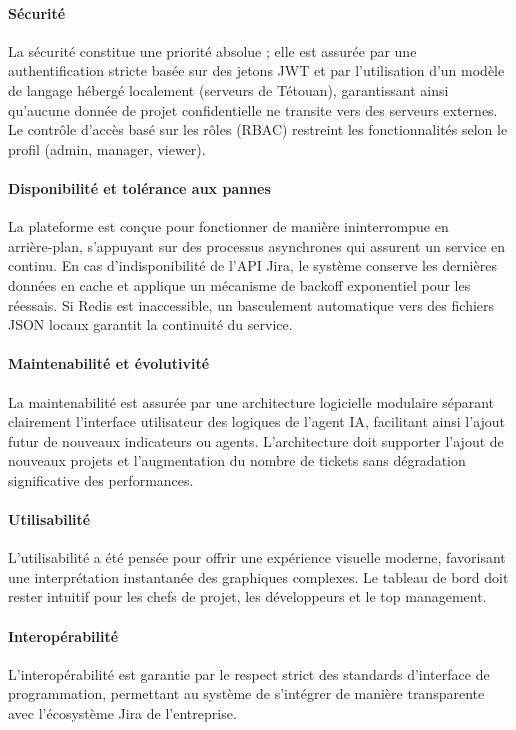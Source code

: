 \paragraph{Sécurité}
La sécurité constitue une priorité absolue ; elle est assurée par une authentification stricte basée sur des jetons JWT et par l’utilisation d’un modèle de langage hébergé localement (serveurs de Tétouan), garantissant ainsi qu’aucune donnée de projet confidentielle ne transite vers des serveurs externes. Le contrôle d’accès basé sur les rôles (RBAC) restreint les fonctionnalités selon le profil (admin, manager, viewer).

\paragraph{Disponibilité et tolérance aux pannes}
La plateforme est conçue pour fonctionner de manière ininterrompue en arrière‑plan, s’appuyant sur des processus asynchrones qui assurent un service en continu. En cas d’indisponibilité de l’API Jira, le système conserve les dernières données en cache et applique un mécanisme de backoff exponentiel pour les réessais. Si Redis est inaccessible, un basculement automatique vers des fichiers JSON locaux garantit la continuité du service.

\paragraph{Maintenabilité et évolutivité}
La maintenabilité est assurée par une architecture logicielle modulaire séparant clairement l’interface utilisateur des logiques de l’agent IA, facilitant ainsi l’ajout futur de nouveaux indicateurs ou agents. L’architecture doit supporter l’ajout de nouveaux projets et l’augmentation du nombre de tickets sans dégradation significative des performances.

\paragraph{Utilisabilité}
L’utilisabilité a été pensée pour offrir une expérience visuelle moderne, favorisant une interprétation instantanée des graphiques complexes. Le tableau de bord doit rester intuitif pour les chefs de projet, les développeurs et le top management.

\paragraph{Interopérabilité}
L’interopérabilité est garantie par le respect strict des standards d’interface de programmation, permettant au système de s’intégrer de manière transparente avec l’écosystème Jira de l’entreprise.

